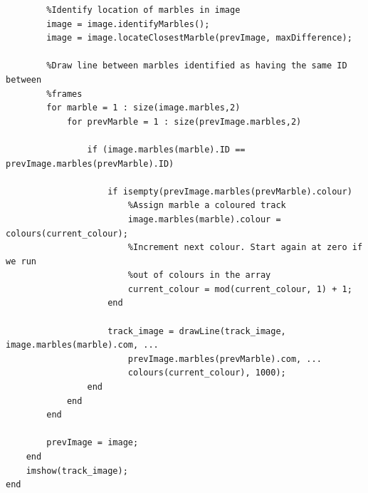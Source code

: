 \documentclass[10pt,a4paper,onecolumn]{report}
\begin{document}
\begin{lstlisting}
        %Identify location of marbles in image
        image = image.identifyMarbles();
        image = image.locateClosestMarble(prevImage, maxDifference);

        %Draw line between marbles identified as having the same ID between
        %frames
        for marble = 1 : size(image.marbles,2)
            for prevMarble = 1 : size(prevImage.marbles,2)
                
                if (image.marbles(marble).ID == prevImage.marbles(prevMarble).ID)
                    
                    if isempty(prevImage.marbles(prevMarble).colour)
                        %Assign marble a coloured track
                        image.marbles(marble).colour = colours(current_colour);
                        %Increment next colour. Start again at zero if we run
                        %out of colours in the array
                        current_colour = mod(current_colour, 1) + 1;
                    end

                    track_image = drawLine(track_image, image.marbles(marble).com, ...
                        prevImage.marbles(prevMarble).com, ...
                        colours(current_colour), 1000);
                end
            end
        end
        
        prevImage = image;
    end
    imshow(track_image);
end
\end{lstlisting}
\end{document}
